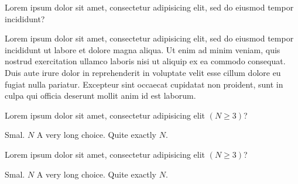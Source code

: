 




\question 
{} %
Lorem ipsum dolor sit amet, consectetur adipisicing elit, sed do eiusmod tempor incididunt?
\begin{choices}
\CHOICE Lorem ipsum dolor sit amet, consectetur adipisicing elit, sed do eiusmod tempor incididunt ut labore et dolore magna aliqua.
\CHOICE Ut enim ad minim veniam, quis nostrud exercitation ullamco laboris nisi ut aliquip ex ea commodo consequat.
\CHOICE Duis aute irure dolor in reprehenderit in voluptate velit esse cillum dolore eu fugiat nulla pariatur.
\choice Excepteur sint occaecat cupidatat non proident, sunt in culpa qui officia deserunt mollit anim id est laborum.
\end{choices}



\question 
{}
Lorem ipsum dolor sit amet, consectetur adipisicing elit $(N \ge 3)$?
\\
\begin{oneparchoices}
\choice Smal.
\choice $N$
\CHOICE A very long choice.
\CHOICE Quite exactly $N$.
\end{oneparchoices}



\question 
{}
Lorem ipsum dolor sit amet, consectetur adipisicing elit $(N \ge 3)$?
\begin{choices}[4]  %
\choice Smal.
\choice $N$
\CHOICE A very long choice.
\choice Quite exactly $N$.
\end{choices}



